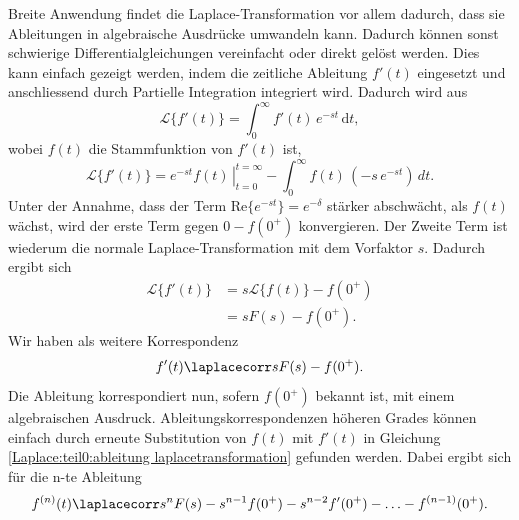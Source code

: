 Breite Anwendung findet die Laplace-Transformation vor allem dadurch, dass sie Ableitungen in algebraische Ausdrücke umwandeln kann.
Dadurch können sonst schwierige Differentialgleichungen vereinfacht oder direkt gelöst werden.
Dies kann einfach gezeigt werden, indem die zeitliche Ableitung $f'(t)$ eingesetzt und anschliessend durch Partielle Integration integriert wird.
Dadurch wird aus
\begin{equation}
	\mathcal{L}\{f'(t)\} = \int_{0}^{\infty} f'(t) \, e^{-st} \, \mathrm{d}t,
\end{equation}
wobei $f(t)$ die Stammfunktion von $f'(t)$ ist,
\begin{equation}
	\mathcal{L}\{f'(t)\} = \left. e^{-st} f(t) \, \right|_{t=0}^{t=\infty} - 
	\int_{0}^{\infty} f(t) \, (-s \, e^{-st}) \, dt.
\end{equation}
Unter der Annahme, dass der Term $\mathrm{Re}\{e^{-st}\} = e^{-\delta}$ stärker abschwächt, als $f(t)$ wächst, wird der erste Term gegen $0 - f(0^+)$ konvergieren. %
Der Zweite Term ist wiederum die normale Laplace-Transformation mit dem Vorfaktor $s$. 
Dadurch ergibt sich
\begin{equation}
	\begin{aligned}
		\mathcal{L}\{f'(t)\} &= s \mathcal{L}\{ f(t) \} - f(0^{+}) \\
		&= sF(s) - f(0^{+}).
	\end{aligned}
	\label{Laplace:teil0:ableitung laplacetransformation}
\end{equation}
Wir haben als weitere Korrespondenz 
\begin{equation}
	f'(t) \laplacecorr sF(s) - f(0^+).
\end{equation}
Die Ableitung korrespondiert nun, sofern $f(0^+)$ bekannt ist, mit einem algebraischen Ausdruck. 
Ableitungskorrespondenzen höheren Grades können einfach durch erneute  Substitution von $ f(t)$ mit $f'(t)$ in Gleichung \ref{Laplace:teil0:ableitung laplacetransformation} gefunden werden.
Dabei ergibt sich für die n-te Ableitung
\begin{equation}
	f^{(n)}(t) \laplacecorr s^{n}F(s) - s^{n-1}f(0^+) - s^{n-2}f'(0^+) - \dotsc - f^{(n-1)}(0^+).
\end{equation}

